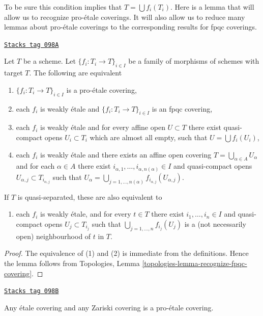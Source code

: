 To be sure this condition implies that $T = \bigcup f_i(T_i)$.
Here is a lemma that will allow us to recognize pro-\'etale coverings.
It will also allow us to reduce many lemmas about pro-\'etale coverings
to the corresponding results for fpqc coverings.

\begin{lemma}
\label{proetale-lemma-recognize-proetale-covering}
\href{https://stacks.math.columbia.edu/tag/098A}{\texttt{Stacks tag 098A}}

Let $T$ be a scheme. Let $\{f_i : T_i \to T\}_{i \in I}$ be a family of
morphisms of schemes with target $T$. The following are equivalent
\begin{enumerate}
\item $\{f_i : T_i \to T\}_{i \in I}$ is a pro-\'etale covering,
\item each $f_i$ is weakly \'etale and $\{f_i : T_i \to T\}_{i \in I}$
is an fpqc covering,
\item each $f_i$ is weakly \'etale and for every affine open $U \subset T$
there exist quasi-compact opens $U_i \subset T_i$ which are almost all empty,
such that $U = \bigcup f_i(U_i)$,
\item each $f_i$ is weakly \'etale and there exists an affine open covering
$T = \bigcup_{\alpha \in A} U_\alpha$ and for each $\alpha \in A$
there exist $i_{\alpha, 1}, \ldots, i_{\alpha, n(\alpha)} \in I$
and quasi-compact opens $U_{\alpha, j} \subset T_{i_{\alpha, j}}$ such that
$U_\alpha =
\bigcup_{j = 1, \ldots, n(\alpha)} f_{i_{\alpha, j}}(U_{\alpha, j})$.
\end{enumerate}
If $T$ is quasi-separated, these are also equivalent to
\begin{enumerate}
\item[(5)] each $f_i$ is weakly \'etale, and for every $t \in T$ there exist
$i_1, \ldots, i_n \in I$ and quasi-compact opens $U_j \subset T_{i_j}$
such that $\bigcup_{j = 1, \ldots, n} f_{i_j}(U_j)$ is a
(not necessarily open) neighbourhood of $t$ in $T$.
\end{enumerate}
\end{lemma}

\begin{proof}
The equivalence of (1) and (2) is immediate from the definitions.
Hence the lemma follows from
Topologies, Lemma \ref{topologies-lemma-recognize-fpqc-covering}.
\end{proof}

\begin{lemma}
\label{proetale-lemma-etale-proetale}
\href{https://stacks.math.columbia.edu/tag/098B}{\texttt{Stacks tag 098B}}

Any \'etale covering and any Zariski covering is a pro-\'etale covering.
\end{lemma}

